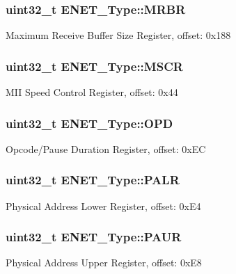 \subsubsection[{\texorpdfstring{M\+R\+BR}{MRBR}}]{ uint32\+\_\+t E\+N\+E\+T\+\_\+\+Type\+::\+M\+R\+BR}\hypertarget{structENET__Type_a481a8606d28f91888899edf2d452acf6}{}\label{structENET__Type_a481a8606d28f91888899edf2d452acf6}
Maximum Receive Buffer Size Register, offset\+: 0x188 
\subsubsection[{\texorpdfstring{M\+S\+CR}{MSCR}}]{ uint32\+\_\+t E\+N\+E\+T\+\_\+\+Type\+::\+M\+S\+CR}\hypertarget{structENET__Type_ac1e3c9ce7694505cb969d1728c02b321}{}\label{structENET__Type_ac1e3c9ce7694505cb969d1728c02b321}
M\+II Speed Control Register, offset\+: 0x44 
\subsubsection[{\texorpdfstring{O\+PD}{OPD}}]{ uint32\+\_\+t E\+N\+E\+T\+\_\+\+Type\+::\+O\+PD}\hypertarget{structENET__Type_a7a0c4ff40dfd2da3f20f28f3f50b991f}{}\label{structENET__Type_a7a0c4ff40dfd2da3f20f28f3f50b991f}
Opcode/\+Pause Duration Register, offset\+: 0x\+EC 
\subsubsection[{\texorpdfstring{P\+A\+LR}{PALR}}]{ uint32\+\_\+t E\+N\+E\+T\+\_\+\+Type\+::\+P\+A\+LR}\hypertarget{structENET__Type_a83047c76f6dab2c6bdd3cb7f8621deac}{}\label{structENET__Type_a83047c76f6dab2c6bdd3cb7f8621deac}
Physical Address Lower Register, offset\+: 0x\+E4 
\subsubsection[{\texorpdfstring{P\+A\+UR}{PAUR}}]{ uint32\+\_\+t E\+N\+E\+T\+\_\+\+Type\+::\+P\+A\+UR}\hypertarget{structENET__Type_a4008aa2e50b3cf079b32546db1054478}{}\label{structENET__Type_a4008aa2e50b3cf079b32546db1054478}
Physical Address Upper Register, offset\+: 0x\+E8 
